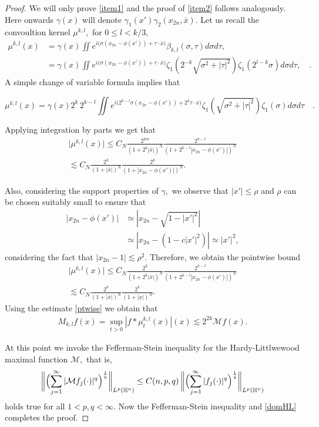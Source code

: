 \documentclass[11pt]{amsart}
\newcommand{\Ha}{\mathbb{H}^n}
\theoremstyle{definition}
\numberwithin{equation}{section}
\begin{document}
\begin{proof}
We will only prove \eqref{item1} and the proof of \eqref{item2} follows analogously. Here onwards $\gamma(x)$ will denote $\gamma_1(x') \gamma_2(x_{2n}, \bar{x}).$ 
Let us recall the convoultion kernel $\mu^{k, l},$ for $0\le l<k/3,$
\begin{align}
\nonumber\mu^{k,l}(x)
&= \gamma(x)
\iint e^{i\big(\sigma(x_{2n}-\phi(x'))+\tau \cdot \bar{x}\big)} 
\beta_{k,l}(\sigma,\tau)d\sigma d\tau,\quad\\  \nonumber&=\gamma(x)
\iint e^{i\big(\sigma(x_{2n}-\phi(x'))+\tau \cdot \bar{x}\big)} 
\zeta_1(2^{-k}\sqrt{\sigma^2+|\tau|^2})\zeta_1(2^{l-k}\sigma)d\sigma d\tau,\quad.
\end{align}
A simple change of variable formula implies that

$$\mu^{k,l}(x)=\gamma(x) 2^{k}\, 2^{k-l}
\iint e^{i\big(2^{k-l}\sigma(x_{2n}-\phi(x'))+2^{k} \tau \cdot \bar{x}\big)} 
\zeta_1(\sqrt{\sigma^2+|\tau|^2})\zeta_1(\sigma)d\sigma d\tau\quad.$$

Applying integration by parts we get that
\begin{align*}
\big|\mu^{k,l}(x)\big| \leq C_{N} \frac{2^{km}}{(1+2^k|\bar{x}|)^N} \frac{2^{k-l}}{(1+2^{k-l}|x_{2n}-\phi(x')|)^N}\\
\lesssim  C_{N} \frac{2^{k}}{(1+|\bar{x}|)^N} \frac{2^{k}}{(1+|x_{2n}-\phi(x')|)^N}.  
\end{align*}

Also, considering the support properties of $\gamma,$ we observe that $|x'|\leq \rho$ and $\rho$ can be chosen suitably small to ensure that 
\begin{align}
\nonumber |x_{2n}-\phi(x')|&\simeq |x_{2n}-\sqrt{1-|x'|^2}|\\
\nonumber&\simeq |x_{2n}-(1-c|x'|^2)|\simeq |x'|^2,
\end{align}
considering the fact that $|x_{2n}-1|\lesssim \rho^2.$ Therefore, we obtain the pointwise bound
\begin{align}
\nonumber\big|\mu^{k,l}(x)\big| \leq C_{N} \frac{2^{k}}{(1+2^k|\bar{x}|)^N} \frac{2^{k-l}}{(1+2^{k-l}|x_{2n}-\phi(x')|)^N}\\
\lesssim  C_{N} \frac{2^{k}}{(1+|\bar{x}|)^N} \frac{2^{k}}{(1+|\underline{x}|)^N}. \label{ptwise} 
\end{align}
Using the estimate \eqref{ptwise} we obtain that 
\begin{align}
M_{k, l}f(x)=\sup_{t>0}|f* \mu^{k, l}_{t}(x)|(x)\lesssim 2^{2k} \mathcal{M}f(x).
\label{domHL}
\end{align}

At this point we invoke the Fefferman-Stein inequality for the Hardy-Littlwewood maximal function $\mathcal{M},$ that is, 
\[
\biggl\|\Bigl(\sum_{j=1}^{\infty}|\mathcal{M} f_j(\cdot)|^q\Bigr)^\frac{1}{q}\biggr\|_{L^p(\Ha)}\leq C(n, p, q)\, \biggl\|\Bigl(\sum_{j=1}^{\infty}|f_j(\cdot)|^q\Bigr)^\frac{1}{q}\biggr\|_{L^p(\Ha)}
\]
 holds true for all $1<p, q<\infty.$ Now the Fefferman-Stein inequality and \eqref{domHL} completes the proof.
\end{proof}
\end{document}

